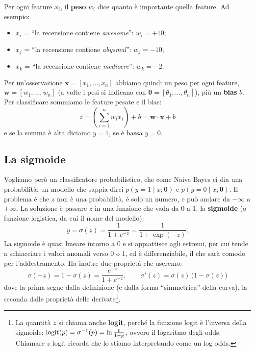 Per ogni feature $x_i$, il \textbf{peso} $w_i$ dice quanto è importante quella feature. Ad esempio:
\begin{itemize}
    \item $x_i$ = \enquote{la recensione contiene \textit{awesome}}: $w_i = +10$;
    \item $x_j$ = \enquote{la recensione contiene \textit{abysmal}}: $w_j = -10$;
    \item $x_k$ = \enquote{la recensione contiene \textit{mediocre}}: $w_k = -2$.
\end{itemize}
Per un'osservazione $\mathbf{x} = [x_1, \dots, x_n]$ abbiamo quindi un peso per ogni feature, $\mathbf{w} = [w_1, \dots, w_n]$ (a volte i pesi si indicano con $\boldsymbol{\theta} = [\theta_1, \dots, \theta_n]$), più un \textbf{bias} $b$. Per classificare sommiamo le feature pesate e il bias:
\begin{equation}
z = \left(\sum_{i=1}^{n} w_i x_i\right) + b = \mathbf{w} \cdot \mathbf{x} + b
\end{equation}
e se la somma è alta diciamo $y = 1$, se è bassa $y = 0$.

\subsection{La sigmoide}
Vogliamo però un classificatore probabilistico, che come Naive Bayes ci dia una probabilità: un modello che sappia dirci $p(y = 1 \mid x; \boldsymbol{\theta})$ e $p(y = 0 \mid x; \boldsymbol{\theta})$. Il problema è che $z$ non è una probabilità, è solo un numero, e può andare da $-\infty$ a $+\infty$. La soluzione è passare $z$ in una funzione che vada da 0 a 1, la \textbf{sigmoide} (o funzione logistica, da cui il nome del modello):
\begin{equation}
y = \sigma(z) = \frac{1}{1 + e^{-z}} = \frac{1}{1 + \exp(-z)}.
\end{equation}
La sigmoide è quasi lineare intorno a 0 e si appiattisce agli estremi, per cui tende a schiacciare i valori anomali verso 0 o 1, ed è differenziabile, il che sarà comodo per l'addestramento. Ha inoltre due proprietà che useremo:
\begin{equation}
\sigma(-z) = 1 - \sigma(z) = \frac{e^{-z}}{1 + e^{-z}}, \qquad \sigma'(z) = \sigma(z)\,\big(1 - \sigma(z)\big)
\end{equation}
dove la prima segue dalla definizione (e dalla forma \enquote{simmetrica} della curva), la seconda dalle proprietà delle derivate\footnote{La quantità $z$ si chiama anche \textbf{logit}, perché la funzione logit è l'inversa della sigmoide: $\operatorname{logit}(p) = \sigma^{-1}(p) = \ln \frac{p}{1 - p}$, ovvero il logaritmo degli odds. Chiamare $z$ logit ricorda che lo stiamo interpretando come un log odds.}.

